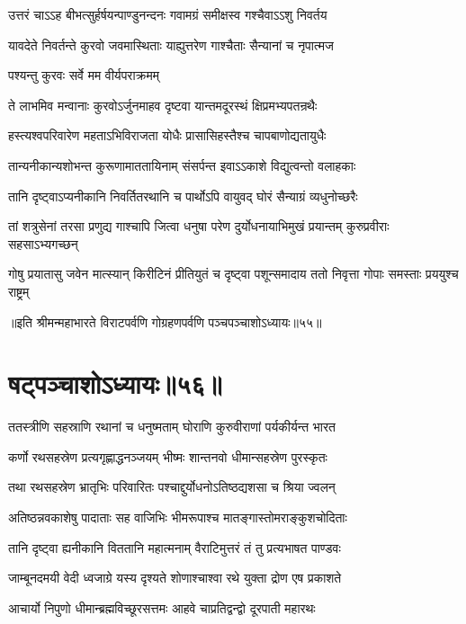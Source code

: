 \twolineshloka
{उत्तरं चाऽऽह बीभत्सुर्हर्षयन्पाण्डुनन्दनः}
{गवामग्रं समीक्षस्व गश्चैवाऽऽशु निवर्तय}


\twolineshloka
{यावदेते निवर्तन्ते कुरवो जवमास्थिताः}
{याह्युत्तरेण गाश्चैताः सैन्यानां च नृपात्मज}


\onelineshloka
{पश्यन्तु कुरवः सर्वे मम वीर्यपराक्रमम्}



\twolineshloka
{ते लाभमिव मन्वानाः कुरवोऽर्जुनमाहव}
{दृष्टवा यान्तमदूरस्थं क्षिप्रमभ्यपतन्रथैः}


\twolineshloka
{हस्त्यश्वपरिवारेण महताऽभिविराजता}
{योधैः प्रासासिहस्तैश्च चापबाणोद्यतायुधैः}


\twolineshloka
{तान्यनीकान्यशोभन्त कुरूणामाततायिनाम्}
{संसर्पन्त इवाऽऽकाशे विद्युत्वन्तो वलाहकाः}

\twolineshloka
{तानि दृष्ट्वाऽप्यनीकानि निवर्तितरथानि च}
{पार्थोऽपि वायुवद् घोरं सैन्याग्रं व्यधुनोच्छरैः}

\fourlineindentedshloka
{तां शत्रुसेनां तरसा प्रणुद्य}
{गाश्चापि जित्वा धनुषा परेण}
{दुर्योधनायाभिमुखं प्रयान्तम्}
{कुरुप्रवीराः सहसाऽभ्यगच्छन्}


\fourlineindentedshloka
{गोषु प्रयातासु जवेन मात्स्यान्}
{किरीटिनं प्रीतियुतं च दृष्ट्वा}
{पशून्समादाय ततो निवृत्ता}
{गोपाः समस्ताः प्रययुश्च राष्ट्रम्}

॥इति श्रीमन्महाभारते विराटपर्वणि गोग्रहणपर्वणि पञ्चपञ्चाशोऽध्यायः॥५५॥

\chapter{षट्पञ्चाशोऽध्यायः॥५६॥}

\twolineshloka
{ततस्त्रीणि सहस्राणि रथानां च धनुष्मताम्}
{घोराणि कुरुवीराणां पर्यकीर्यन्त भारत}


\twolineshloka
{कर्णो रथसहस्रेण प्रत्यगृह्णाद्धनञ्जयम्}
{भीष्मः शान्तनवो धीमान्सहस्रेण पुरस्कृतः}


\twolineshloka
{तथा रथसहस्रेण भ्रातृभिः परिवारितः}
{पश्चाद्दुर्योधनोऽतिष्ठद्यशसा च श्रिया ज्वलन्}


\twolineshloka
{अतिष्ठन्नवकाशेषु पादाताः सह वाजिभिः}
{भीमरूपाश्च मातङ्गास्तोमराङ्कुशचोदिताः}


\twolineshloka
{तानि दृष्ट्वा ह्यनीकानि विततानि महात्मनाम्}
{वैराटिमुत्तरं तं तु प्रत्यभाषत पाण्डवः}


\twolineshloka
{जाम्बूनदमयी वेदी ध्वजाग्रे यस्य दृश्यते}
{शोणाश्चाश्वा रथे युक्ता द्रोण एष प्रकाशते}


\twolineshloka
{आचार्यो निपुणो धीमान्ब्रह्मविच्छूरसत्तमः}
{आहवे चाप्रतिद्वन्द्वो दूरपाती महारथः}


